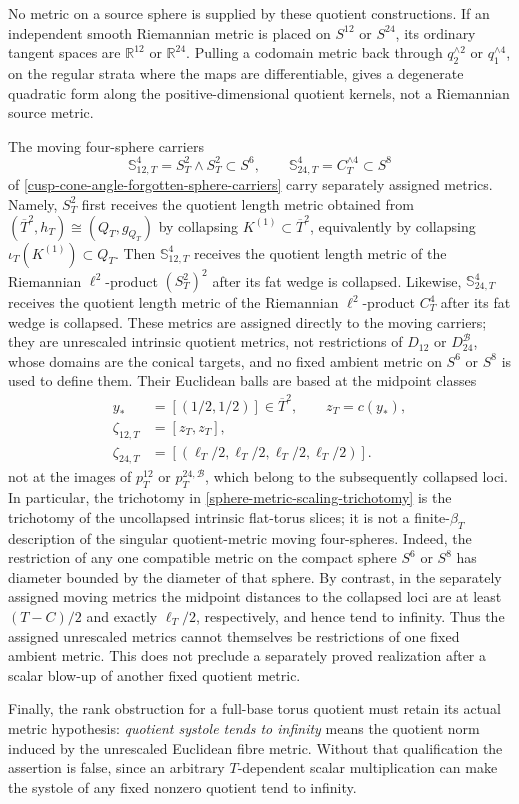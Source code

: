 No metric on a source sphere is supplied by these quotient constructions.
If an independent smooth Riemannian metric is placed on \(S^{12}\) or
\(S^{24}\), its ordinary tangent spaces are \(\mathbb R^{12}\) or
\(\mathbb R^{24}\).  Pulling a codomain metric back through
\(q_2^{\wedge2}\) or \(q_1^{\wedge4}\), on the regular strata where the
maps are differentiable, gives a degenerate quadratic form along the
positive-dimensional quotient kernels, not a Riemannian source metric.

The moving four-sphere carriers
\[
 \mathbb S_{12,T}^4=S_T^2\wedge S_T^2\subset S^6,\qquad
 \mathbb S_{24,T}^4=C_T^{\wedge4}\subset S^8
\]
of \cref{cusp-cone-angle-forgotten-sphere-carriers} carry separately
assigned metrics.  Namely, \(S_T^2\) first receives the quotient length
metric obtained from
\((\overline T^2,h_T)\cong(Q_T,g_{Q_T})\) by collapsing
\(K^{(1)}\subset\overline T^2\), equivalently by collapsing
\(\iota_T(K^{(1)})\subset Q_T\).  Then
\(\mathbb S_{12,T}^4\) receives the quotient length metric of the
Riemannian \(\ell^2\)-product \((S_T^2)^2\) after its fat wedge is
collapsed.  Likewise, \(\mathbb S_{24,T}^4\) receives the quotient length
metric of the Riemannian \(\ell^2\)-product \(C_T^4\) after its fat wedge is
collapsed.  These metrics are assigned directly to the moving carriers;
they are unrescaled intrinsic quotient metrics, not restrictions of
\(D_{12}\) or \(D_{24}^{\mathcal B}\), whose domains are the conical
targets, and no fixed ambient metric on \(S^6\) or \(S^8\) is used to
define them.  Their Euclidean balls are
based at the midpoint classes
\[
 \begin{aligned}
  y_*&=[(1/2,1/2)]\in\overline T^2,\qquad z_T=c(y_*),\\
  \zeta_{12,T}&=[z_T,z_T],\\
  \zeta_{24,T}
  &=[(\ell_T/2,\ell_T/2,\ell_T/2,\ell_T/2)].
 \end{aligned}
\]
not at the images of \(p_T^{12}\) or \(p_T^{24,\mathcal B}\), which belong
to the subsequently collapsed loci.  In particular, the trichotomy in
\cref{sphere-metric-scaling-trichotomy} is the trichotomy of the
uncollapsed intrinsic flat-torus slices; it is not a finite-\(\beta_T\)
description of the singular quotient-metric moving four-spheres.  Indeed,
the restriction of any one compatible metric on the compact sphere
\(S^6\) or \(S^8\) has diameter bounded by the diameter of that sphere.  By
contrast, in the separately assigned moving metrics the midpoint distances
to the collapsed loci are at least \((T-C)/2\) and exactly
\(\ell_T/2\), respectively, and hence tend to infinity.  Thus the assigned
unrescaled metrics cannot themselves be restrictions of one fixed ambient
metric.  This does not preclude a separately proved realization after a
scalar blow-up of another fixed quotient metric.

Finally, the rank obstruction for a full-base torus quotient must retain
its actual metric hypothesis: \emph{quotient systole tends to infinity}
means the quotient norm induced by the unrescaled Euclidean fibre metric.
Without that qualification the assertion is false, since an arbitrary
\(T\)-dependent scalar multiplication can make the systole of any fixed
nonzero quotient tend to infinity.
